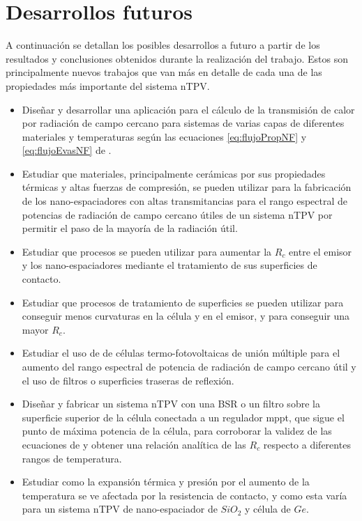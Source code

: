 \section{Desarrollos futuros}
A continuación se detallan los posibles desarrollos a futuro a partir de los resultados y conclusiones obtenidos durante la realización del trabajo. Estos son principalmente nuevos trabajos que van más en detalle de cada una de las propiedades más importante del sistema nTPV.
\begin{itemize}
	\item Diseñar y desarrollar una aplicación para el cálculo de la transmisión de calor por radiación de campo cercano para sistemas de varias capas de diferentes materiales y temperaturas según las ecuaciones \eqref{eq:flujoPropNF} y \eqref{eq:flujoEvasNF} de \cite{nfTPV_fullEquations}.
	\item Estudiar que materiales, principalmente cerámicas por sus propiedades térmicas y altas fuerzas de compresión, se pueden utilizar para la fabricación de los nano-espaciadores con altas transmitancias para el rango espectral de potencias de radiación de campo cercano útiles de un sistema nTPV por permitir el paso de la mayoría de la radiación útil.
	\item Estudiar que procesos se pueden utilizar para aumentar la $R_c$ entre el emisor y los nano-espaciadores mediante el tratamiento de sus superficies de contacto.
	\item Estudiar que procesos de tratamiento de superficies se pueden utilizar para conseguir menos curvaturas en la célula y en el emisor, y para conseguir una mayor $R_c$.
	\item Estudiar el uso de de células termo-fotovoltaicas de unión múltiple para el aumento del rango espectral de potencia de radiación de campo cercano útil y el uso de filtros o superficies traseras de reflexión.
	\item Diseñar y fabricar un sistema nTPV con una BSR o un filtro sobre la superficie superior de la célula conectada a un regulador mppt, que sigue el punto de máxima potencia de la célula, para corroborar la validez de las ecuaciones de \cite{nfTPV_fullEquations} y obtener una relación analítica de las $R_c$ respecto a diferentes rangos de temperatura.
	\item Estudiar como la expansión térmica y presión por el aumento de la temperatura se ve afectada por la resistencia de contacto, y como esta varía para un sistema nTPV de nano-espaciador de $SiO_2$ y célula de $Ge$.
\end{itemize}